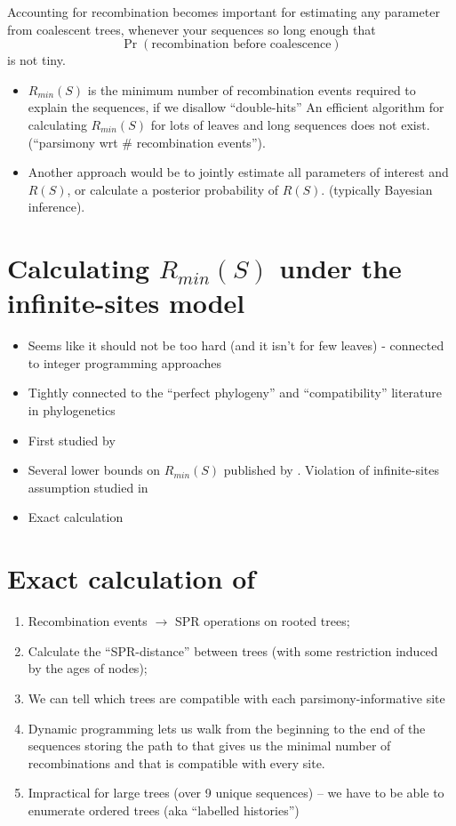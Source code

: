 \documentclass[landscape]{foils}
\begin{document}
\myNewSlide
Accounting for recombination becomes important for estimating any parameter from coalescent trees,
whenever your sequences so long enough that $$\Pr(\mbox{recombination before coalescence})$$ is not tiny.

\begin{itemize}
	\item $R_{min}(S)$ is the minimum number of recombination events required to explain the sequences, if we disallow ``double-hits''
An efficient algorithm for calculating $R_{min}(S)$ for lots of leaves and long sequences does not exist. (``parsimony wrt \# recombination events'').
	\item Another approach would be to jointly estimate all parameters of interest and $R(S)$, or calculate a posterior probability of $R(S)$. (typically Bayesian inference).
\end{itemize}

\myNewSlide
\section*{Calculating $R_{min}(S)$ under the infinite-sites model}
\begin{itemize}
	\item Seems like it should not be too hard (and it isn't for few leaves) - connected to integer programming approaches
	\item Tightly connected to the ``perfect phylogeny'' and ``compatibility'' literature in phylogenetics
	\item First studied by \citet{HudsonK1985}
	\item Several lower bounds on $R_{min}(S)$ published by \citet{MyersG2003,SongH2004}. Violation of infinite-sites assumption studied in \citet{LiuF2008}
	\item Exact calculation \citet{Hein1990,Hein1993,SongH2003}
\end{itemize}

\myNewSlide
\section*{Exact calculation of \citet{SongH2004}}
\normalsize
\begin{enumerate}
	\item Recombination events $\rightarrow$ SPR operations on rooted trees;
	\item Calculate the ``SPR-distance'' between trees (with some restriction induced by the ages of nodes);
	\item We can tell which trees are compatible with each parsimony-informative site
	\item Dynamic programming lets us walk from the beginning to the end of the sequences storing the path to that gives us the minimal number of recombinations and that is compatible with every site.
	\item Impractical for large trees (over 9 unique sequences) -- we have to be able to enumerate ordered trees (aka ``labelled histories'')
\end{enumerate}
\end{document}
